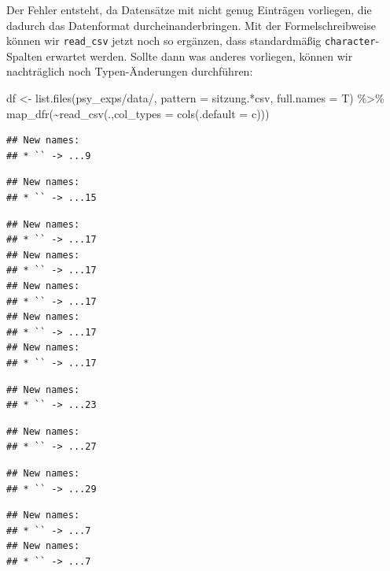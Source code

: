 \documentclass[
]{book}
\newenvironment{Shaded}{\begin{snugshade}}{\end{snugshade}}
\newcommand{\AttributeTok}[1]{\textcolor[rgb]{0.77,0.63,0.00}{#1}}
\newcommand{\FunctionTok}[1]{\textcolor[rgb]{0.00,0.00,0.00}{#1}}
\newcommand{\NormalTok}[1]{#1}
\newcommand{\OtherTok}[1]{\textcolor[rgb]{0.56,0.35,0.01}{#1}}
\newcommand{\SpecialCharTok}[1]{\textcolor[rgb]{0.00,0.00,0.00}{#1}}
\newcommand{\StringTok}[1]{\textcolor[rgb]{0.31,0.60,0.02}{#1}}
\begin{document}
Der Fehler entsteht, da Datensätze mit nicht genug Einträgen vorliegen, die dadurch das Datenformat durcheinanderbringen.
Mit der Formelschreibweise können wir \texttt{read\_csv} jetzt noch so ergänzen, dass standardmäßig \texttt{character}-Spalten erwartet werden. Sollte dann was anderes vorliegen, können wir nachträglich noch Typen-Änderungen durchführen:

\begin{Shaded}
\begin{Highlighting}[]
\NormalTok{df }\OtherTok{\textless{}{-}} \FunctionTok{list.files}\NormalTok{(}\StringTok{\textquotesingle{}psy\_exps/data/\textquotesingle{}}\NormalTok{,}
           \AttributeTok{pattern =} \StringTok{\textquotesingle{}sitzung.*csv\textquotesingle{}}\NormalTok{,}
           \AttributeTok{full.names =}\NormalTok{ T) }\SpecialCharTok{\%\textgreater{}\%} 
  \FunctionTok{map\_dfr}\NormalTok{(}\SpecialCharTok{\textasciitilde{}}\FunctionTok{read\_csv}\NormalTok{(.,}\AttributeTok{col\_types =} \FunctionTok{cols}\NormalTok{(}\AttributeTok{.default =} \StringTok{\textquotesingle{}c\textquotesingle{}}\NormalTok{)))}
\end{Highlighting}
\end{Shaded}

\begin{verbatim}
## New names:
## * `` -> ...9
\end{verbatim}

\begin{verbatim}
## New names:
## * `` -> ...15
\end{verbatim}

\begin{verbatim}
## New names:
## * `` -> ...17
## New names:
## * `` -> ...17
## New names:
## * `` -> ...17
## New names:
## * `` -> ...17
## New names:
## * `` -> ...17
\end{verbatim}

\begin{verbatim}
## New names:
## * `` -> ...23
\end{verbatim}

\begin{verbatim}
## New names:
## * `` -> ...27
\end{verbatim}

\begin{verbatim}
## New names:
## * `` -> ...29
\end{verbatim}

\begin{verbatim}
## New names:
## * `` -> ...7
## New names:
## * `` -> ...7
\end{verbatim}
\end{document}
